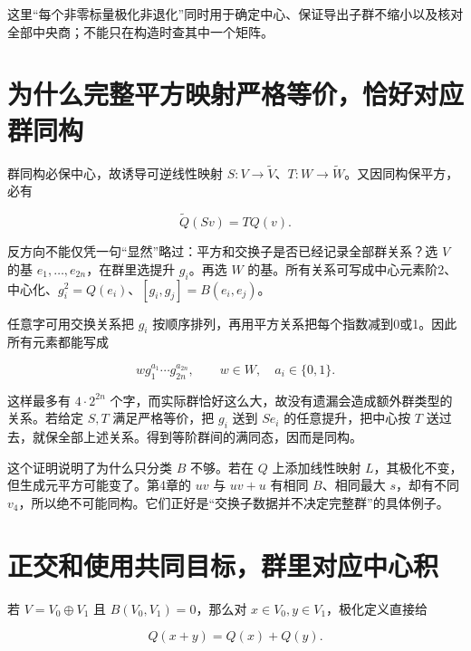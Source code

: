 \documentclass[UTF8,fontset=fandol,zihao=-4,openany,oneside]{ctexbook}
\begin{document}
这里“每个非零标量极化非退化”同时用于确定中心、保证导出子群不缩小以及核对全部中央商；不能只在构造时查其中一个矩阵。



\section{为什么完整平方映射严格等价，恰好对应群同构}


群同构必保中心，故诱导可逆线性映射 \(S:V\to\widetilde V\)、\(T:W\to\widetilde W\)。又因同构保平方，必有



\[
\widetilde Q(Sv)=TQ(v).
\]



反方向不能仅凭一句“显然”略过：平方和交换子是否已经记录全部群关系？选 \(V\) 的基 \(e_1,\ldots,e_{2n}\)，在群里选提升 \(g_i\)。再选 \(W\) 的基。所有关系可写成中心元素阶2、中心化、\(g_i^2=Q(e_i)\)、\([g_i,g_j]=B(e_i,e_j)\)。



任意字可用交换关系把 \(g_i\) 按顺序排列，再用平方关系把每个指数减到0或1。因此所有元素都能写成



\[
w g_1^{a_1}\cdots g_{2n}^{a_{2n}},\qquad w\in W,\quad a_i\in\{0,1\}.
\]



这样最多有 \(4\cdot2^{2n}\) 个字，而实际群恰好这么大，故没有遗漏会造成额外群类型的关系。若给定 \(S,T\) 满足严格等价，把 \(g_i\) 送到 \(Se_i\) 的任意提升，把中心按 \(T\) 送过去，就保全部上述关系。得到等阶群间的满同态，因而是同构。



这个证明说明了为什么只分类 \(B\) 不够。若在 \(Q\) 上添加线性映射 \(L\)，其极化不变，但生成元平方可能变了。第4章的 \(uv\) 与 \(uv+u\) 有相同 \(B\)、相同最大 \(s\)，却有不同 \(v_4\)，所以绝不可能同构。它们正好是“交换子数据并不决定完整群”的具体例子。



\section{正交和使用共同目标，群里对应中心积}


若 \(V=V_0\oplus V_1\) 且 \(B(V_0,V_1)=0\)，那么对 \(x\in V_0,y\in V_1\)，极化定义直接给



\[
Q(x+y)=Q(x)+Q(y).
\]
\end{document}
